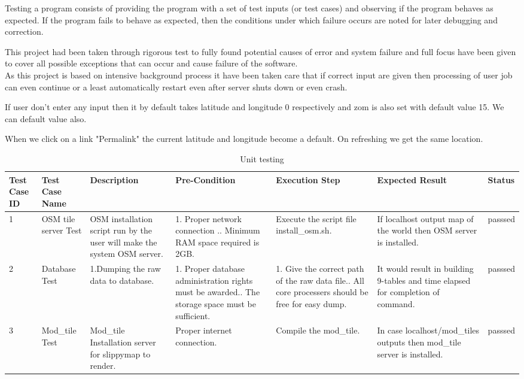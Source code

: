 Testing a program consists of providing the program with a set of test inputs (or test cases) and
observing if the program behaves as expected. If the program fails to behave as expected, then the
conditions under which failure occurs are noted for later debugging and correction.


This project had been taken through rigorous test to fully found potential causes of error and system failure
and full focus have been given to cover all possible exceptions that can
occur and cause failure of the software.\\
As this project is based on intensive background process it have been taken care that if correct input are given then processing of user job can even continue or a least automatically restart even after server shuts down or even crash.

If user don't enter any input then it by default takes latitude and longitude 0 respectively and zom is also set with default value 15. We can default value also.

When we click on a link "Permalink" the current latitude and longitude become a default. On refreshing we get the same location.

\begin{table}
\caption{Unit testing}

\begin{tabular}{|p{1cm}|p{2cm}|p{3cm}|p{2cm}|p{2cm}|p{3cm}|p{1.2cm}|}
\hline
Test Case ID & Test Case Name & Description & Pre-Condition
 & Execution Step & Expected Result
 & Status \\
\hline \rule[-2ex]{0pt}{5.5ex}  1 &
OSM tile server
Test
 &  OSM installation script run by the user will make the system OSM server.
 & 1. Proper network connection	.\newline
 2. Minimum RAM space required is 2GB.
&  Execute the script file install\_osm.sh.
 & If localhost output map of the world then OSM server is installed.
 &  passsed\\
\hline \rule[-2ex]{0pt}{5.5ex}  2 &
Database
Test
& 1.Dumping the raw data to database.\newline
& 1. Proper database administration rights must be awarded.\newline
 2. The storage space must be sufficient.\newline
 & 1. Give the correct path of the raw data file.\newline
 2. All core processers should be free for easy dump.\newline
 & It would result in building 9-tables and time elapsed for completion of command.
  & passsed\\
\hline \rule[-2ex]{0pt}{5.5ex}  3 &
Mod\_tile
Test
& Mod\_tile Installation server for slippymap to render.
 & Proper internet connection.
& Compile the mod\_tile.
 & In case localhost/mod\_tiles outputs then mod\_tile server is installed.
  & passsed\\
\hline
\end{tabular}
\end{table}

